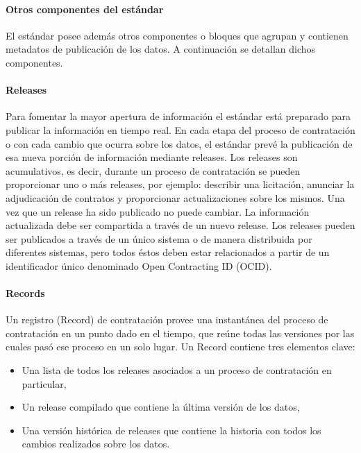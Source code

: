 \paragraph{Otros componentes del estándar}

El estándar posee además otros componentes o bloques que agrupan y contienen metadatos de publicación de los datos.  A continuación se detallan dichos componentes.

\paragraph{Releases}
Para fomentar la mayor apertura de información el estándar está preparado para publicar la información en tiempo real. En cada etapa del proceso de contratación o con cada cambio que ocurra sobre los datos, el estándar prevé la publicación de esa nueva porción de información mediante releases.
Los releases son acumulativos, es decir, durante un proceso de contratación se pueden proporcionar uno o más releases, por ejemplo: describir una licitación, anunciar la adjudicación de contratos y proporcionar actualizaciones sobre los mismos.
Una vez que un release ha sido publicado no puede cambiar. La información actualizada debe ser compartida a través de un nuevo release.
Los releases pueden ser publicados a través de un único sistema o de manera distribuida por diferentes sistemas, pero todos éstos deben estar relacionados a partir de un identificador único denominado Open Contracting ID (OCID).

\paragraph{Records}

Un registro (Record) de contratación provee una instantánea del proceso de contratación en un punto dado en el tiempo, que reúne todas las versiones por las cuales pasó ese proceso en un solo lugar.
Un Record contiene tres elementos clave: 
\begin{itemize}
    \item Una lista de todos los releases asociados a un proceso de contratación en particular, 
    \item Un release compilado que contiene la última versión de los datos,
    \item Una versión histórica de releases que contiene la historia con todos los cambios realizados sobre los datos.
\end{itemize}

